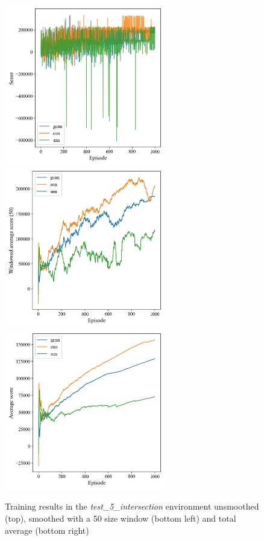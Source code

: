 \documentclass[
]{elteikthesis}[2023/04/10]
\begin{document}
\begin{figure}[H]
\begin{centering}
\includegraphics[width=7cm,height=7cm,keepaspectratio]{images/scores_history_comparison_test_5_intersection}
\includegraphics[width=7cm,height=7cm,keepaspectratio]{images/windowed_scores_comparison_test_5_intersection}\includegraphics[width=7cm,height=7cm,keepaspectratio]{images/average_scores_comparison_test_5_intersection}
\par\end{centering}
\caption{Training results in the \emph{test\_5\_intersection} environment unsmoothed
(top), smoothed with a 50 size window (bottom left) and total average
(bottom right)}
\end{figure}
\end{document}
